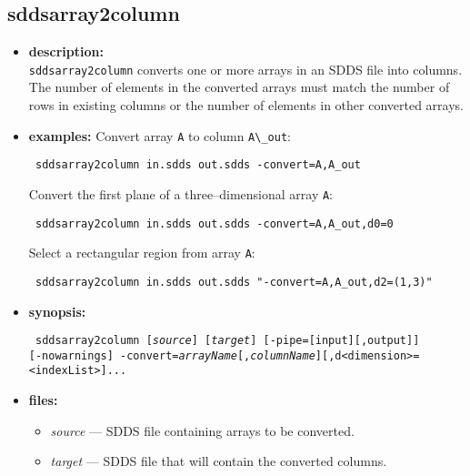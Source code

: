 \newpage
\subsection{sddsarray2column}
\label{sddsarray2column}

\begin{itemize}
\item {\bf description:} \hspace*{1mm}\\
{\tt sddsarray2column} converts one or more arrays in an SDDS file into columns. The
number of elements in the converted arrays must match the number of rows in
existing columns or the number of elements in other converted arrays.

\item {\bf examples:}
  Convert array \verb|A| to column \verb|A\_out|:
  \begin{flushleft}{\tt
  sddsarray2column in.sdds out.sdds -convert=A,A\_out
  }\end{flushleft}
Convert the first plane of a three--dimensional array \verb|A|:
  \begin{flushleft}{\tt
  sddsarray2column in.sdds out.sdds -convert=A,A\_out,d0=0
  }\end{flushleft}
Select a rectangular region from array \verb|A|:
  \begin{flushleft}{\tt
  sddsarray2column in.sdds out.sdds "-convert=A,A\_out,d2=(1,3)"
  }\end{flushleft}

\item {\bf synopsis:}
\begin{flushleft}{\tt
  sddsarray2column [{\em source}] [{\em target}] [-pipe=[input][,output]]\\
  {}[-nowarnings] -convert={\em arrayName}[,{\em columnName}][,d<dimension>=<indexList>]...
  }\end{flushleft}

\item {\bf files:}
\begin{itemize}
  \item {\em source} --- SDDS file containing arrays to be converted.
  \item {\em target} --- SDDS file that will contain the converted columns.
\end{itemize}


\end{itemize}
